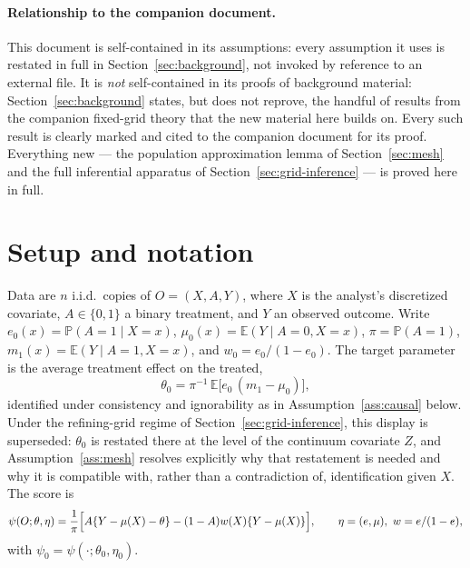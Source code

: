 \documentclass[11pt]{article}
\theoremstyle{plain}
\theoremstyle{definition}
\theoremstyle{remark}
\newcommand{\E}{\mathbb{E}}
\newcommand{\PP}{\mathbb{P}}
\newcommand{\ez}{e_0}
\newcommand{\mz}{\mu_0}
\newcommand{\wz}{w_0}
\begin{document}
\paragraph{Relationship to the companion document.} This document is
self-contained in its assumptions: every assumption it uses is restated in
full in Section~\ref{sec:background}, not invoked by reference to an
external file. It is \emph{not} self-contained in its proofs of background
material: Section~\ref{sec:background} states, but does not reprove, the
handful of results from the companion fixed-grid theory that the new
material here builds on. Every such result is clearly marked and cited to
the companion document for its proof. Everything new --- the population
approximation lemma of Section~\ref{sec:mesh} and the full inferential
apparatus of Section~\ref{sec:grid-inference} --- is proved here in full.

\section{Setup and notation}\label{sec:setup}

Data are $n$ i.i.d.\ copies of $O=(X,A,Y)$, where $X$ is the analyst's
discretized covariate, $A\in\{0,1\}$ a binary treatment, and $Y$ an observed
outcome. Write $\ez(x)=\PP(A=1\mid X=x)$, $\mz(x)=\E(Y\mid A=0,X=x)$,
$\pi=\PP(A=1)$, $m_1(x)=\E(Y\mid A=1,X=x)$, and $\wz=\ez/(1-\ez)$. The
target parameter is the average treatment effect on the treated,
\[
  \theta_0=\pi^{-1}\,\E\bigl[\ez\,(m_1-\mz)\bigr],
\]
identified under consistency and ignorability as in
Assumption~\ref{ass:causal} below. Under the refining-grid regime of
Section~\ref{sec:grid-inference}, this display is superseded: $\theta_0$ is
restated there at the level of the continuum covariate $Z$, and
Assumption~\ref{ass:mesh} resolves explicitly why that restatement is
needed and why it is compatible with, rather than a contradiction of,
identification given $X$. The score is
\[
  \psi(O;\theta,\eta)
  =\frac1\pi\Bigl[A\{Y-\mu(X)-\theta\}-(1-A)w(X)\{Y-\mu(X)\}\Bigr],
  \qquad \eta=(e,\mu),\ w=e/(1-e),
\]
with $\psi_0=\psi(\cdot;\theta_0,\eta_0)$.
\end{document}
